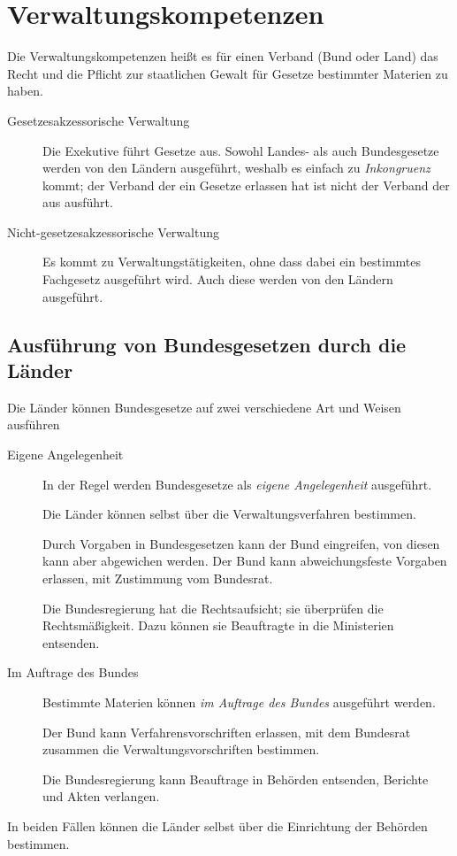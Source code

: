 \documentclass{article}
\begin{document}
\section{Verwaltungskompetenzen} 
Die Verwaltungskompetenzen heißt es für einen Verband (Bund oder Land) das Recht und die Pflicht zur staatlichen Gewalt für Gesetze bestimmter Materien zu haben.
\begin{description}
 \item[Gesetzesakzessorische Verwaltung] Die Exekutive führt Gesetze aus. Sowohl Landes- als auch Bundesgesetze werden \idr von den Ländern ausgeführt, weshalb es einfach zu \emph{Inkongruenz} kommt; der Verband der ein Gesetze erlassen hat ist nicht der Verband der aus ausführt.
 \item[Nicht-gesetzesakzessorische Verwaltung] Es kommt zu Verwaltungstätigkeiten, ohne dass dabei ein bestimmtes Fachgesetz ausgeführt wird. Auch diese werden \idr von den Ländern ausgeführt.
\end{description}

\subsection{Ausführung von Bundesgesetzen durch die Länder}
Die Länder können Bundesgesetze auf zwei verschiedene Art und Weisen ausführen
\begin{description}
 \item[Eigene Angelegenheit] In der Regel werden Bundesgesetze als \emph{eigene Angelegenheit} ausgeführt.

Die Länder können selbst über die Verwaltungsverfahren bestimmen.

Durch Vorgaben in Bundesgesetzen kann der Bund eingreifen, von diesen kann aber abgewichen werden. Der Bund kann abweichungsfeste Vorgaben erlassen, mit Zustimmung vom Bundesrat.

Die Bundesregierung hat die Rechtsaufsicht; sie überprüfen die Rechtsmäßigkeit. Dazu können sie Beauftragte in die Ministerien entsenden.
 \item[Im Auftrage des Bundes] Bestimmte Materien können \emph{im Auftrage des Bundes} ausgeführt werden.

Der Bund kann Verfahrensvorschriften erlassen, mit dem Bundesrat zusammen die Verwaltungsvorschriften bestimmen.

Die Bundesregierung kann Beauftrage in Behörden entsenden, Berichte und Akten verlangen.
\end{description}
In beiden Fällen können die Länder selbst über die Einrichtung der Behörden bestimmen.
\end{document}
